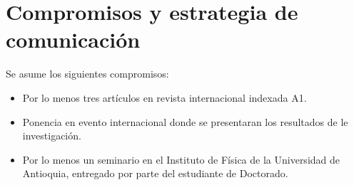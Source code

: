 \section{ Compromisos y estrategia de comunicación }


Se asume los siguientes compromisos:

\begin{itemize}

\item Por lo menos tres artículos en revista internacional indexada
  A1.

\item Ponencia en evento internacional donde se presentaran los resultados de le
  investigación.

\item
Por lo menos un seminario en el Instituto de Física de la Universidad
de Antioquia, entregado por parte del estudiante de Doctorado.

\end{itemize}



